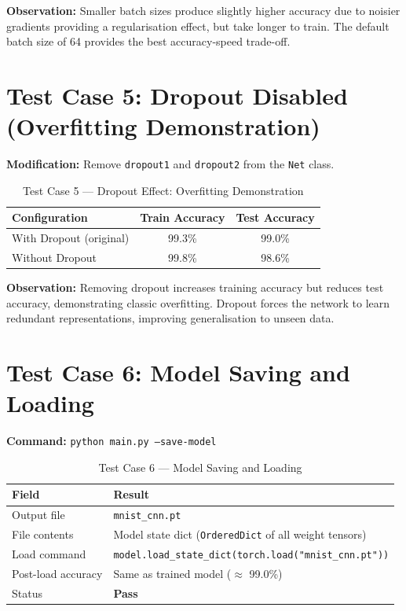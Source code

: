 \documentclass[12pt,a4paper,openany]{report}
\begin{document}
\textbf{Observation:} Smaller batch sizes produce slightly higher accuracy due to noisier gradients providing a regularisation effect, but take longer to train. The default batch size of 64 provides the best accuracy-speed trade-off.

\section{Test Case 5: Dropout Disabled (Overfitting Demonstration)}

\textbf{Modification:} Remove \texttt{dropout1} and \texttt{dropout2} from the \texttt{Net} class.

\begin{table}[H]
\centering
\begin{tabular}{|l|c|c|}
\hline
\textbf{Configuration}    & \textbf{Train Accuracy} & \textbf{Test Accuracy} \\
\hline
With Dropout (original)   & 99.3\%                  & 99.0\% \\
Without Dropout           & 99.8\%                  & 98.6\% \\
\hline
\end{tabular}
\caption{Test Case 5 --- Dropout Effect: Overfitting Demonstration}
\end{table}

\textbf{Observation:} Removing dropout increases training accuracy but reduces test accuracy, demonstrating classic overfitting. Dropout forces the network to learn redundant representations, improving generalisation to unseen data.

\section{Test Case 6: Model Saving and Loading}

\textbf{Command:} \texttt{python main.py --save-model}

\begin{table}[H]
\centering
\begin{tabular}{|l|p{9cm}|}
\hline
\textbf{Field}          & \textbf{Result} \\
\hline
Output file             & \texttt{mnist\_cnn.pt} \\
File contents           & Model state dict (\texttt{OrderedDict} of all weight tensors) \\
Load command            & \texttt{model.load\_state\_dict(torch.load("mnist\_cnn.pt"))} \\
Post-load accuracy      & Same as trained model ($\approx$ 99.0\%) \\
Status                  & \textbf{Pass} \\
\hline
\end{tabular}
\caption{Test Case 6 --- Model Saving and Loading}
\end{table}
\end{document}
